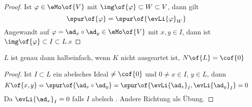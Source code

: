 \begin{proof}
	Ist $\varphi \in \eMo\of{V}$ mit $\img\of{\varphi} \subset W \subset V$, dann gilt 
	\begin{equation}
		\spur\of{\varphi} = \spur\of{\evLi{\varphi}_W}
	\end{equation}
	Angewandt auf $\varphi = \ad_x \circ \ad_y \in \eMo\of{V}$ mit $x,y \in I$, dann ist $\img\of{\varphi} \subset I \subset L$.s
\end{proof}
\begin{satz}[Cartan]
	$L$ ist genau dann halbeinfach, wenn $K$ nicht ausgeartet ist, \dah $N\of{L} = \cof{0}$
\end{satz}
\begin{proof}
	Ist $I \subset L$ ein abelsches Ideal $\neq \cof{0}$ und $0 \neq x \in I$, $y \in L$, dann 
	\begin{equation}
		K\of{x,y} = \spur\of{\ad_x\circ\ad_y} = \spur\of{\evLi{\ad_x}_I,\evLi{\ad_y}_I} = 0
	\end{equation}
	Da $\evLi{\ad_x}_I = 0$ falls $I$ abelsch . Andere Richtung als Übung.
\end{proof}